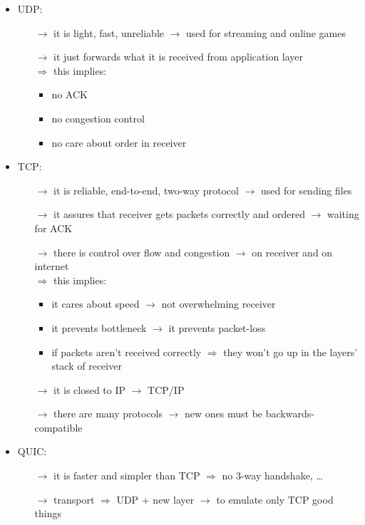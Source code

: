 \begin{itemize}
    \item UDP:
    \begin{itemize}
        \item[$\rightarrow$] it is light, fast, unreliable $\rightarrow$ used for streaming and online games
        \item[$\rightarrow$] it just forwards what it is received from application layer\\
        $\Rightarrow$ this implies:
        \begin{itemize}
            \item no ACK
            \item no congestion control
            \item no care about order in receiver
        \end{itemize}
    \end{itemize}
    \item TCP:
    \begin{itemize}
        \item[$\rightarrow$] it is reliable, end-to-end, two-way protocol $\rightarrow$ used for sending files
        \item[$\rightarrow$] it assures that receiver gets packets correctly and ordered $\rightarrow$ waiting for ACK
        \item[$\rightarrow$] there is control over flow and congestion $\rightarrow$ on receiver and on internet\\
        $\Rightarrow$ this implies:
        \begin{itemize}
            \item it cares about speed $\rightarrow$ not overwhelming receiver
            \item it prevents bottleneck $\rightarrow$ it prevents packet-loss
            \item if packets aren't received correctly $\Rightarrow$ they won't go up in the layers' stack of receiver 
        \end{itemize}
        \item[$\rightarrow$] it is closed to IP $\rightarrow$ TCP/IP
        \item[$\rightarrow$] there are many protocols $\rightarrow$ new ones must be backwards-compatible
    \end{itemize}
    \item QUIC:
    \begin{itemize}
        \item[$\rightarrow$] it is faster and simpler than TCP $\Rightarrow$ no 3-way handshake, \dots
        \item[$\rightarrow$] transport $\Rightarrow$ UDP + new layer $\rightarrow$ to emulate only TCP good things
    \end{itemize}
\end{itemize}

